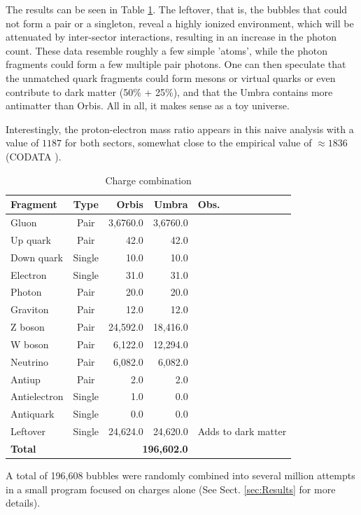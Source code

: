 \documentclass[12pt]{article}
\begin{document}
The results can be seen in Table \ref{combina}. The leftover, that is, the bubbles that could not form a pair or a singleton, reveal a highly ionized environment, which will be attenuated by inter-sector interactions, resulting in an increase in the photon count. These data resemble roughly a few simple 'atoms', while the photon fragments could form a few multiple pair photons. One can then speculate that the unmatched quark fragments could form mesons or virtual quarks or even contribute to dark matter (50\% + 25\%), and that the Umbra contains more antimatter than Orbis. All in all, it makes sense as a toy universe. 

Interestingly, the proton-electron mass ratio appears in this naive analysis with a value of $1187$ for both sectors, somewhat close to the empirical value of $\approx1836$ (CODATA \cite{codata}). 

\begin{table}
\caption{Charge combination}

\medskip{}
\label{combina}
\begin{centering}
{\small{}}%
\begin{tabular}{|l|c|r|r|l|}
\hline 
\textbf{\small{}Fragment} & \textbf{\small{}Type} & \textbf{\small{}Orbis} & \textbf{Umbra} & \textbf{\small{}Obs.}\tabularnewline
\hline 
\hline 
{\small{}Gluon} & {\small{}Pair} & {\small{}3,6760.0} & {\small{}3,6760.0} & \tabularnewline
\hline 
{\small{}Up quark} & {\small{}Pair} & {\small{}42.0} & {\small{}42.0} & \tabularnewline
\hline 
{\small{}Down quark} & {\small{}Single} & {\small{}10.0} & {\small{}10.0} & \tabularnewline
\hline 
{\small{}Electron} & {\small{}Single} & {\small{}31.0} & {\small{}31.0} & \tabularnewline
\hline 
{\small{}Photon} & {\small{}Pair} & {\small{}20.0} & {\small{}20.0} & \tabularnewline
\hline 
{\small{}Graviton} & {\small{}Pair} & {\small{}12.0} & {\small{}12.0} & \tabularnewline
\hline 
{\small{}Z boson} & {\small{}Pair} & {\small{}24,592.0} & {\small{}18,416.0} & \tabularnewline
\hline 
{\small{}W boson} & {\small{}Pair} & {\small{}6,122.0} & {\small{}12,294.0} & \tabularnewline
\hline 
{\small{}Neutrino} & {\small{}Pair} & {\small{}6,082.0} & {\small{}6,082.0} & \tabularnewline
\hline 
{\small{}Antiup} & {\small{}Pair} & {\small{}2.0} & {\small{}2.0} & \tabularnewline
\hline 
{\small{}Antielectron} & {\small{}Single} & {\small{}1.0} & {\small{}0.0} & \tabularnewline
\hline 
{\small{}Antiquark} & {\small{}Single} & {\small{}0.0} & {\small{}0.0} & \tabularnewline
\hline 
{\small{}Leftover} & {\small{}Single} & {\small{}24,624.0} & {\small{}24,620.0} & {\small{}Adds to dark matter}\tabularnewline
\hline 
\textbf{\small{}Total} &  & \multicolumn{2}{r|}{\textbf{\small{}196,602.0 }} & \tabularnewline
\hline 
\end{tabular}{\small\par}
\par\end{centering}
\medskip{}

{\small{}A total of 196,608 bubbles were randomly combined into several million attempts in a small program focused on charges alone (See Sect. \ref{sec:Results} for more details).}{\small\par}
\end{table}
\end{document}
